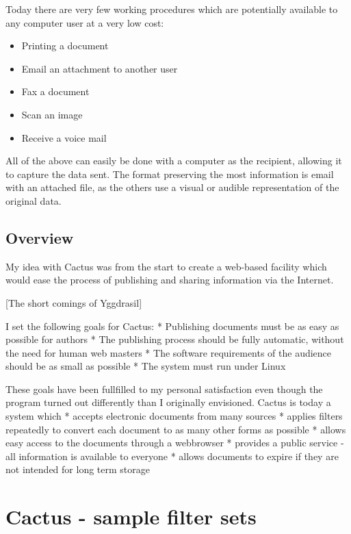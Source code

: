 Today there are very few working procedures which are
potentially available to any computer user at a very low
cost:

\begin{itemize}
\item Printing a document
\item Email an attachment to another user
\item Fax a document
\item Scan an image
\item Receive a voice mail
\end{itemize}

All of the above can easily be done with a computer as the
recipient, allowing it to capture the data sent.  The format
preserving the most information is email with an attached
file, as the others use a visual or audible representation
of the original data.




\section{Overview}

My idea with Cactus was from the start to create a web-based
facility which would ease the process of publishing and
sharing information via the Internet.

[The short comings of Yggdrasil]

I set the following goals for Cactus: * Publishing documents
must be as easy as possible for authors * The publishing
process should be fully automatic, without the need for
human web masters * The software requirements of the
audience should be as small as possible * The system must
run under Linux

These goals have been fullfilled to my personal satisfaction
even though the program turned out differently than I
originally envisioned. Cactus is today a system which *
accepts electronic documents from many sources * applies
filters repeatedly to convert each document to as many other
forms as possible * allows easy access to the documents
through a webbrowser * provides a public service - all
information is available to everyone * allows documents to
expire if they are not intended for long term storage


\chapter{Cactus - sample filter sets}
\label{cha:cactus-sample-filter-sets}

